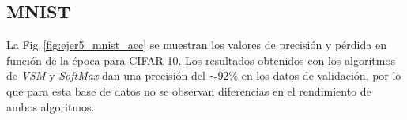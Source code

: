\subsection*{MNIST} 


La Fig.\,\ref{fig:ejer5_mnist_acc}  se muestran los valores de precisión y pérdida en función de la época para CIFAR-10.  Los resultados obtenidos con los algoritmos de \emph{VSM} y \emph{SoftMax} dan una precisión del   $\sim92\%$ en los datos de validación, por lo que para esta base de datos no se observan diferencias en el rendimiento  de ambos algoritmos.



